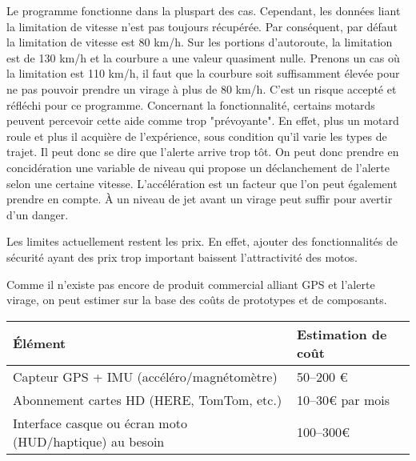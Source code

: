 
Le programme fonctionne dans la pluspart des cas. Cependant, les données liant la limitation de vitesse n'est pas toujours récupérée. Par conséquent, par défaut la limitation de vitesse est 80 km/h. Sur les portions d'autoroute, la limitation est de 130 km/h et la courbure a une valeur quasiment nulle. Prenons un cas où la limitation est 110 km/h, il faut que la courbure soit suffisamment élevée pour ne pas pouvoir prendre un virage à plus de 80 km/h. C'est un risque accepté et réfléchi pour ce programme.
Concernant la fonctionnalité, certains motards peuvent percevoir cette aide comme trop "prévoyante". En effet, plus un motard roule et plus il acquière de l'expérience, sous condition qu'il varie les types de trajet. Il peut donc se dire que l'alerte arrive trop tôt. On peut donc prendre en concidération une variable de niveau qui propose un déclanchement de l'alerte selon une certaine vitesse. L'accélération est un facteur que l'on peut également prendre en compte. À un niveau de jet avant un virage peut suffir pour avertir d'un danger.

Les limites actuellement restent les prix. En effet, ajouter des fonctionnalités de sécurité ayant des prix trop important baissent l'attractivité des motos. 


Comme il n’existe pas encore de produit commercial alliant GPS et l'alerte virage, on peut estimer sur la base des coûts de prototypes et de composants.\\

\begin{tabular}{|l|l|}
\hline
\textbf{Élément} & \textbf{Estimation de coût} \\
\hline
Capteur GPS + IMU (accéléro/magnétomètre)  & 50–200 € \\
Abonnement cartes HD (HERE, TomTom, etc.) &    10–30€ par mois   \\
Interface casque ou écran moto (HUD/haptique) au besoin & 100–300€ \\
\hline
\end{tabular}


